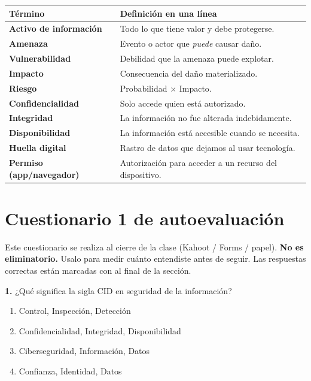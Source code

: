 \documentclass[12pt,a4paper]{article}
\renewcommand{\arraystretch}{1.25}
\begin{document}
\renewcommand{\arraystretch}{1.4}
\begin{tabularx}{\textwidth}{>{\bfseries}p{4cm}X}
\toprule
T\'ermino & Definici\'on en una l\'inea \\
\midrule
Activo de informaci\'on & Todo lo que tiene valor y debe protegerse. \\
Amenaza               & Evento o actor que \emph{puede} causar da\~no. \\
Vulnerabilidad        & Debilidad que la amenaza puede explotar. \\
Impacto               & Consecuencia del da\~no materializado. \\
Riesgo                & Probabilidad $\times$ Impacto. \\
Confidencialidad      & Solo accede quien est\'a autorizado. \\
Integridad            & La informaci\'on no fue alterada indebidamente. \\
Disponibilidad        & La informaci\'on est\'a accesible cuando se necesita. \\
Huella digital        & Rastro de datos que dejamos al usar tecnolog\'ia. \\
Permiso (app/navegador) & Autorizaci\'on para acceder a un recurso del dispositivo. \\
\bottomrule
\end{tabularx}

\newpage
\section{Cuestionario 1 de autoevaluaci\'on}

\begin{cajaNota}[title={Instrucciones}]
Este cuestionario se realiza al cierre de la clase (Kahoot / Forms / papel).
\textbf{No es eliminatorio.} Usalo para medir cu\'anto entendiste antes de seguir.
Las respuestas correctas est\'an marcadas con  al final de la secci\'on.
\end{cajaNota}

\vspace{6pt}

\textbf{1.} ¿Qu\'e significa la sigla CID en seguridad de la informaci\'on?
\begin{enumerate}[label=\alph*), leftmargin=2.5em]
  \item Control, Inspecci\'on, Detecci\'on
  \item Confidencialidad, Integridad, Disponibilidad
  \item Ciberseguridad, Informaci\'on, Datos
  \item Confianza, Identidad, Datos
\end{enumerate}
\end{document}
